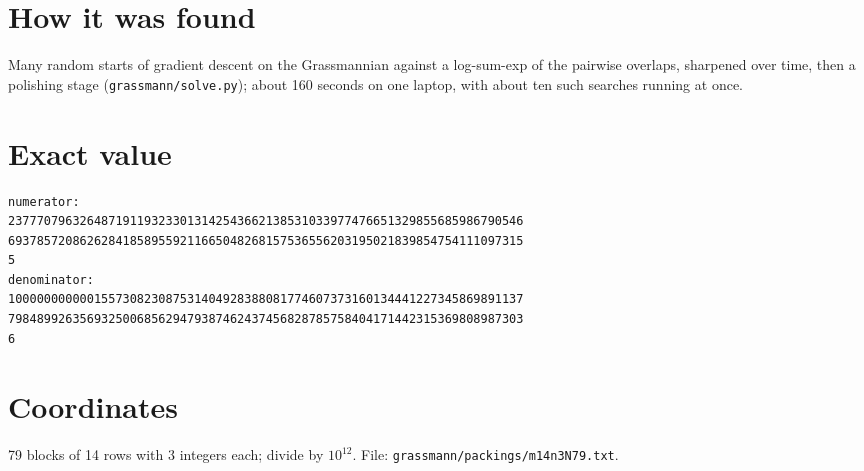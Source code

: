 \documentclass[11pt,a4paper]{article}
\begin{document}
\section{How it was found}
Many random starts of gradient descent on the Grassmannian against a log-sum-exp of the pairwise overlaps, sharpened over time, then a polishing stage (\texttt{grassmann/solve.py}); about 160 seconds on one laptop, with about ten such searches running at once.


\appendix
\section{Exact value}
{\small
\begin{verbatim}
numerator:
237770796326487191193233013142543662138531033977476651329855685986790546
693785720862628418589559211665048268157536556203195021839854754111097315
5
denominator:
100000000000155730823087531404928388081774607373160134441227345869891137
798489926356932500685629479387462437456828785758404171442315369808987303
6
\end{verbatim}}

\section{Coordinates}
79 blocks of 14 rows with 3 integers each; divide by $10^{12}$. File: \texttt{grassmann/packings/m14n3N79.txt}.
{\tiny
\begin{multicols}{3}
\end{multicols}}
\end{document}
